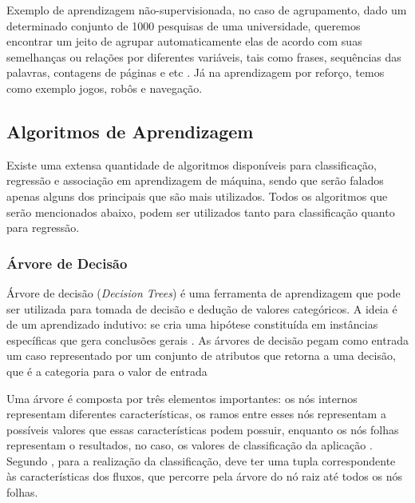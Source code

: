 \par
Exemplo de aprendizagem não-supervisionada, no caso de agrupamento, dado um determinado conjunto de 1000 pesquisas de uma universidade, queremos encontrar um jeito de agrupar automaticamente elas de acordo com suas semelhanças ou relações por diferentes variáveis, tais como frases, sequências das palavras, contagens de páginas e etc \cite{Pedro}. Já na aprendizagem por reforço, temos como exemplo jogos, robôs e navegação.


\subsection{Algoritmos de Aprendizagem}

\par
Existe uma extensa quantidade de algoritmos disponíveis para classificação, regressão e associação em aprendizagem de máquina, sendo que serão falados apenas alguns dos principais que são mais utilizados. Todos os algoritmos que serão mencionados abaixo, podem ser utilizados tanto para classificação quanto para regressão. %


\subsubsection{Árvore de Decisão}

\par
Árvore de decisão (\textit{Decision Trees}) é uma ferramenta de aprendizagem que pode ser utilizada para tomada de decisão e dedução de valores categóricos. A ideia é de um aprendizado indutivo: se cria uma hipótese constituída em instâncias específicas que gera conclusões gerais \cite{Marques2014}. As árvores de decisão pegam como entrada um caso representado por um conjunto de atributos que retorna a uma decisão, que é a categoria para o valor de entrada


\par
Uma árvore é composta por três elementos importantes: os nós internos representam diferentes características, os ramos entre esses nós representam a possíveis valores que essas características podem possuir, enquanto os nós folhas representam o resultados, no caso, os valores de classificação da aplicação \cite{Henke2011, Barros2012}. Segundo , para a realização da classificação, deve ter uma tupla correspondente às características dos fluxos, que percorre pela árvore do nó raiz até  todos os nós folhas.  

